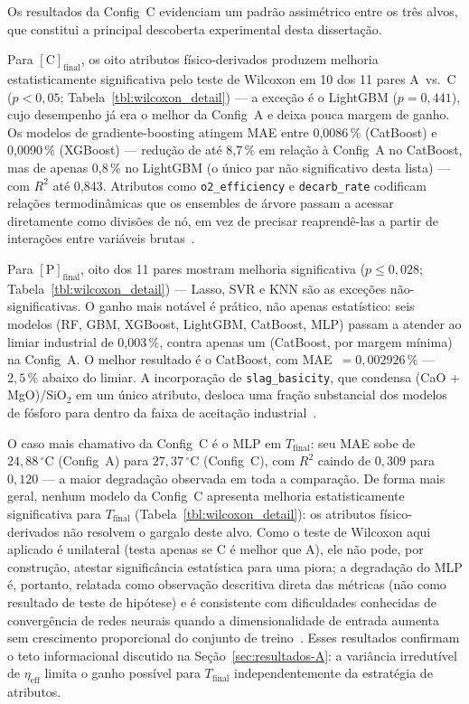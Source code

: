 Os resultados da Config~C evidenciam um padrão assimétrico entre os três alvos, que constitui a principal descoberta experimental desta dissertação.

Para $[\text{C}]_\text{final}$, os oito atributos físico-derivados produzem melhoria estatisticamente significativa pelo teste de Wilcoxon em 10 dos 11 pares A~vs.~C ($p < 0{,}05$; Tabela~\ref{tbl:wilcoxon_detail}) --- a exceção é o LightGBM ($p = 0{,}441$), cujo desempenho já era o melhor da Config~A e deixa pouca margem de ganho. Os modelos de gradiente-boosting atingem MAE entre 0{,}0086\,\% (CatBoost) e 0{,}0090\,\% (XGBoost) --- redução de até 8{,}7\,\% em relação à Config~A no CatBoost, mas de apenas 0{,}8\,\% no LightGBM (o único par não significativo desta lista) --- com $R^2$ até 0{,}843. Atributos como \texttt{o2\_efficiency} e \texttt{decarb\_rate} codificam relações termodinâmicas que os ensembles de árvore passam a acessar diretamente como divisões de nó, em vez de precisar reaprendê-las a partir de interações entre variáveis brutas~\cite{willard2020integrating,shao2024hybrid}.

Para $[\text{P}]_\text{final}$, oito dos 11 pares mostram melhoria significativa ($p \leq 0{,}028$; Tabela~\ref{tbl:wilcoxon_detail}) --- Lasso, SVR e KNN são as exceções não-significativas. O ganho mais notável é prático, não apenas estatístico: seis modelos (RF, GBM, XGBoost, LightGBM, CatBoost, MLP) passam a atender ao limiar industrial de 0{,}003\,\%, contra apenas um (CatBoost, por margem mínima) na Config~A. O melhor resultado é o CatBoost, com MAE~$= 0{,}002926\,\%$ --- $2{,}5\,\%$ abaixo do limiar. A incorporação de \texttt{slag\_basicity}, que condensa (CaO + MgO)/$\text{SiO}_2$ em um único atributo, desloca uma fração substancial dos modelos de fósforo para dentro da faixa de aceitação industrial~\cite{bae2020bof,chattopadhyay2022hybrid}.

O caso mais chamativo da Config~C é o MLP em $T_\text{final}$: seu MAE sobe de $24{,}88\,^\circ\text{C}$ (Config~A) para $27{,}37\,^\circ\text{C}$ (Config~C), com $R^2$ caindo de $0{,}309$ para $0{,}120$ --- a maior degradação observada em toda a comparação. De forma mais geral, nenhum modelo da Config~C apresenta melhoria estatisticamente significativa para $T_\text{final}$ (Tabela~\ref{tbl:wilcoxon_detail}): os atributos físico-derivados não resolvem o gargalo deste alvo. Como o teste de Wilcoxon aqui aplicado é unilateral (testa apenas se C é melhor que A), ele não pode, por construção, atestar significância estatística para uma piora; a degradação do MLP é, portanto, relatada como observação descritiva direta das métricas (não como resultado de teste de hipótese) e é consistente com dificuldades conhecidas de convergência de redes neurais quando a dimensionalidade de entrada aumenta sem crescimento proporcional do conjunto de treino~\cite{goodfellow2016deep,grinsztajn2022tree}. Esses resultados confirmam o teto informacional discutido na Seção~\ref{sec:resultados-A}: a variância irredutível de $\eta_\text{eff}$ limita o ganho possível para $T_\text{final}$ independentemente da estratégia de atributos.


